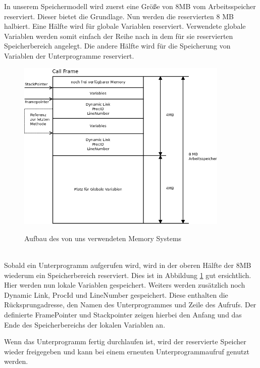 In unserem Speichermodell wird zuerst eine Größe von 8MB vom Arbeitsspeicher reserviert. Dieser bietet die Grundlage. Nun werden die reservierten 8 MB halbiert. Eine Hälfte wird für globale Variablen reserviert. Verwendete globale Variablen werden somit einfach der Reihe nach in dem für sie reservierten Speicherbereich angelegt. Die andere Hälfte wird für die Speicherung von Variablen der Unterprogramme reserviert.

\begin{figure}[Stack Frame]
\begin{center}
\includegraphics[width=0.9\textwidth]{./media/images/interpreter/memory/stackframe.png}
\label{fig:stackframe1} 
\caption{Aufbau des von uns verwendeten Memory Systems}
\end{center}
\end{figure}
\\
Sobald ein Unterprogramm aufgerufen wird, wird in der oberen Hälfte der 8MB wiederum ein Speicherbereich reserviert. Dies ist in Abbildung \ref{fig:stackframe1} gut ersichtlich. Hier werden nun lokale Variablen gespeichert. Weiters werden zusätzlich noch Dynamic Link, ProcId und LineNumber gespeichert. Diese enthalten die Rücksprungadresse, den Namen des Unterprogrammes und Zeile des Aufrufs. Der definierte FramePointer und Stackpointer zeigen hierbei den Anfang und das Ende des Speicherbereichs der lokalen Variablen an.

Wenn das Unterprogramm fertig durchlaufen ist, wird der reservierte Speicher wieder freigegeben und kann bei einem erneuten Unterprogrammaufruf genutzt werden.


